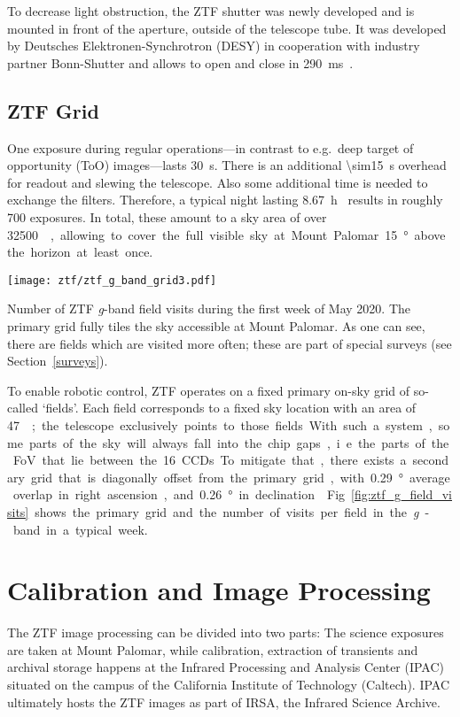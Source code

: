 To decrease light obstruction, the ZTF shutter was newly developed and is mounted in front of the aperture, outside of the telescope tube. It was developed by Deutsches Elektronen-Synchrotron (DESY) in cooperation with industry partner Bonn-Shutter and allows to open and close in \SI{290}{\milli\second}~\cite{Dekany2020}.

\subsection{ZTF Grid}\label{ztf_grid}
One exposure during regular operations---in contrast to e.g.\ deep target of opportunity (ToO) images---lasts \SI{30}{\second}. There is an additional \SI{\sim15}{\second} overhead for readout and slewing the telescope. Also some additional time is needed to exchange the filters. Therefore, a typical night lasting \SI{8.67}{\hour}~ results in roughly 700 exposures. In total, these amount to a sky area of over \SI{32500}{\square\deg}, allowing to cover the full visible sky at Mount Palomar \SI{15}{\degree} above the horizon at least once.

\begin{marginfigure}
    \texttt{[image: ztf/ztf\_g\_band\_grid3.pdf]}
    \caption[ZTF field visits]{Number of ZTF \textit{g}-band field visits during the first week of May 2020. The primary grid fully tiles the sky accessible at Mount Palomar. As one can see, there are fields which are visited more often; these are part of special surveys (see Section~\ref{surveys}).}
\end{marginfigure}

To enable robotic control, ZTF operates on a fixed primary on-sky grid of so-called `fields'. Each field corresponds to a fixed sky location with an area of \SI{47}{\square\deg}; the telescope exclusively points to those fields. With such a system, some parts of the sky will always fall into the chip gaps, i.e. the parts of the FoV that lie between the 16 CCDs. To mitigate that, there exists a secondary grid that is diagonally offset from the primary grid, with \SI{0.29}{\degree} average overlap in right ascension, and \SI{0.26}{\degree} in declination~. Fig.~\ref{fig:ztf_g_field_visits} shows the primary grid and the number of visits per field in the \textit{g}-band in a typical week.

\section{Calibration and Image Processing}
The ZTF image processing can be divided into two parts: The science exposures are taken at Mount Palomar, while calibration, extraction of transients and archival storage happens at the Infrared Processing and Analysis Center (IPAC) situated on the campus of the California Institute of Technology (Caltech). IPAC ultimately hosts the ZTF images as part of IRSA, the Infrared Science Archive.

